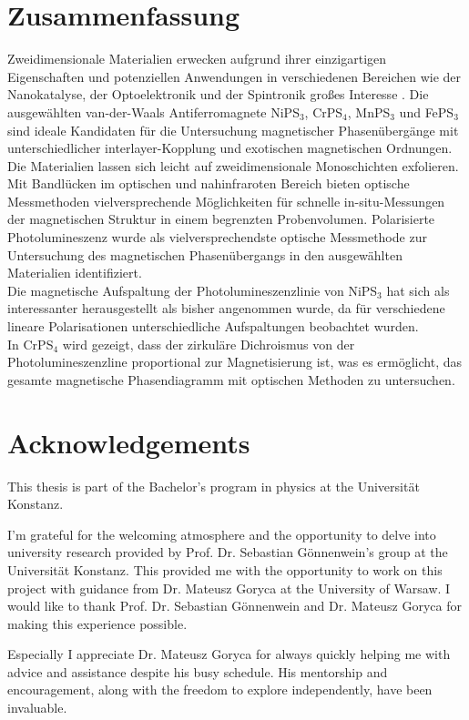 \documentclass[
	oneside,
	parskip=half,
	a4paper,
]{scrbook}
\begin{document}
\section*{Zusammenfassung}
Zweidimensionale Materialien erwecken aufgrund ihrer einzigartigen Eigenschaften und potenziellen Anwendungen in verschiedenen Bereichen wie der Nanokatalyse, der Optoelektronik und der Spintronik großes Interesse \cite{MPX_review}.
Die ausgewählten van-der-Waals Antiferromagnete NiPS$_3$, CrPS$_4$, MnPS$_3$ und FePS$_3$ sind ideale Kandidaten für die Untersuchung magnetischer Phasenübergänge mit unterschiedlicher interlayer-Kopplung und exotischen magnetischen Ordnungen.
Die Materialien lassen sich leicht auf zweidimensionale Monoschichten exfolieren.\\
Mit Bandlücken im optischen und nahinfraroten Bereich bieten optische Messmethoden vielversprechende Möglichkeiten für schnelle in-situ-Messungen der magnetischen Struktur in einem begrenzten Probenvolumen. 
Polarisierte Photolumineszenz wurde als vielversprechendste optische Messmethode zur Untersuchung des magnetischen Phasenübergangs in den ausgewählten Materialien identifiziert.\\
Die magnetische Aufspaltung der Photolumineszenzlinie von NiPS$_3$ hat sich als interessanter herausgestellt als bisher angenommen wurde, da für verschiedene lineare Polarisationen unterschiedliche Aufspaltungen beobachtet wurden.\\
In CrPS$_4$ wird gezeigt, dass der zirkuläre Dichroismus von der Photolumineszenzline proportional zur Magnetisierung ist, was es ermöglicht, das gesamte magnetische Phasendiagramm mit optischen Methoden zu untersuchen.
\vfill

\cleardoublepage
\section*{Acknowledgements}
This thesis is part of the Bachelor's program in physics at the Universität Konstanz.

I'm grateful for the welcoming atmosphere and the opportunity to delve into university research provided by Prof. Dr. Sebastian Gönnenwein's group at the Universität Konstanz. 
This provided me with the opportunity to work on this project with guidance from Dr. Mateusz Goryca at the University of Warsaw.
I would like to thank Prof. Dr. Sebastian Gönnenwein and Dr. Mateusz Goryca for making this experience possible.

Especially I appreciate Dr. Mateusz Goryca for always quickly helping me with advice and assistance despite his busy schedule.
His mentorship and encouragement, along with the freedom to explore independently, have been invaluable.
\end{document}
